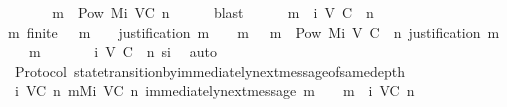 \begin{isabellebody}
\ \ \isamarkupfalse%
\ \isamarkupfalse%
\ {\isachardoublequoteopen}{\isasymsigma}\ {\isasymunion}\ {\isacharbraceleft}m{\isacharbraceright}\ {\isasymin}\ Pow\ {\isacharparenleft}Mi\ {\isacharparenleft}V{\isacharcomma}C{\isacharcomma}{\isasymepsilon}{\isacharparenright}\ n{\isacharparenright}{\isachardoublequoteclose}\isanewline
\ \ \ \ \isamarkupfalse%
\ blast\isanewline
\isanewline
\ \ \isamarkupfalse%
\ {\isachardoublequoteopen}{\isasymsigma}\ {\isasymunion}\ {\isacharbraceleft}m{\isacharbraceright}\ {\isasymin}\ {\isasymSigma}i\ {\isacharparenleft}V{\isacharcomma}\ C{\isacharcomma}\ {\isasymepsilon}{\isacharparenright}\ {\isacharparenleft}n\ {\isacharplus}\ {}{\isacharparenright}{\isachardoublequoteclose}\isanewline
\ \ \ \ \isamarkupfalse%
\ {\isacartoucheopen}{\isasymAnd}m{\isacharprime}{\isachardot}\ finite\ {\isasymsigma}\ {\isasymand}\ m{\isacharprime}\ {\isasymin}\ {\isasymsigma}\ {\isasymLongrightarrow}\ justification\ m{\isacharprime}\ {\isasymsubseteq}\ {\isasymsigma}\ {\isasymunion}\ {\isacharbraceleft}m{\isacharbraceright}{\isacartoucheclose}\ {\isacartoucheopen}{\isasymsigma}\ {\isasymunion}\ {\isacharbraceleft}m{\isacharbraceright}\ {\isasymin}\ Pow\ {\isacharparenleft}Mi\ {\isacharparenleft}V{\isacharcomma}\ C{\isacharcomma}\ {\isasymepsilon}{\isacharparenright}\ n{\isacharparenright}{\isacartoucheclose}\ {\isacartoucheopen}justification\ m\ {\isasymsubseteq}\ {\isasymsigma}\ {\isasymunion}\ {\isacharbraceleft}m{\isacharbraceright}{\isacartoucheclose}\ \isanewline
\ \ \ \ {\isacartoucheopen}{\isasymsigma}\ {\isasymin}\ {\isasymSigma}i\ {\isacharparenleft}V{\isacharcomma}\ C{\isacharcomma}\ {\isasymepsilon}{\isacharparenright}\ n{\isacartoucheclose}\ si\ \isamarkupfalse%
\ auto\isanewline
{}\isamarkupfalse%
%
\endisatagproof
{\isafoldproof}%
%
\isadelimproof
\isanewline
%
\endisadelimproof
\isanewline
{}\isamarkupfalse%
\ {\isacharparenleft}\ Protocol{\isacharparenright}\ state{\isacharunderscore}transition{\isacharunderscore}by{\isacharunderscore}immediately{\isacharunderscore}next{\isacharunderscore}message{\isacharunderscore}of{\isacharunderscore}same{\isacharunderscore}depth{\isacharcolon}\ \isanewline
\ \ {\isachardoublequoteopen}{\isasymforall}{\isasymsigma}{\isasymin}{\isasymSigma}i\ {\isacharparenleft}V{\isacharcomma}C{\isacharcomma}{\isasymepsilon}{\isacharparenright}\ n{\isachardot}\ {\isasymforall}m{\isasymin}Mi\ {\isacharparenleft}V{\isacharcomma}C{\isacharcomma}{\isasymepsilon}{\isacharparenright}\ n{\isachardot}\ immediately{\isacharunderscore}next{\isacharunderscore}message\ {\isacharparenleft}{\isasymsigma}{\isacharcomma}m{\isacharparenright}\ {\isasymlongrightarrow}\ {\isasymsigma}\ {\isasymunion}\ {\isacharbraceleft}m{\isacharbraceright}\ {\isasymin}\ {\isasymSigma}i\ {\isacharparenleft}V{\isacharcomma}C{\isacharcomma}{\isasymepsilon}{\isacharparenright}\ {\isacharparenleft}n{\isacharplus}{}{\isacharparenright}{\isachardoublequoteclose}\isanewline

\end{isabellebody}
